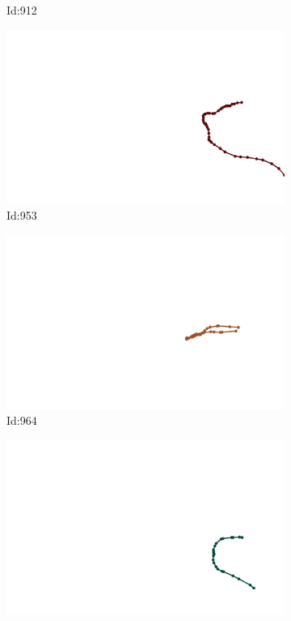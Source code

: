 \documentclass[12pt,twoside]{report}
\begin{document}
\begin{figure}
\begin{subfigure}[b]{0.20\textwidth}
\caption{Id:912}
\end{subfigure}
\begin{subfigure}[b]{0.20\textwidth}
\centering
\includegraphics[width=\textwidth]{../trajectories/953.png}
\caption{Id:953}
\end{subfigure}
\begin{subfigure}[b]{0.20\textwidth}
\centering
\includegraphics[width=\textwidth]{../trajectories/964.png}
\caption{Id:964}
\end{subfigure}
\begin{subfigure}[b]{0.20\textwidth}
\centering
\includegraphics[width=\textwidth]{../trajectories/965.png}

\end{subfigure}
\end{figure}
\end{document}
